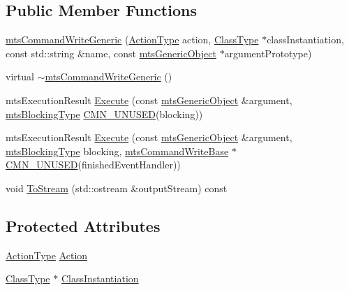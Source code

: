 \subsection*{Public Member Functions}
\begin{DoxyCompactItemize}
\item 
\hyperlink{classmts_command_write_generic_a756523d52f33b00d0591f4dc88869059}{mts\+Command\+Write\+Generic} (\hyperlink{classmts_command_write_generic_aa941087c4b92213fe1b6b670f4ce5a36}{Action\+Type} action, \hyperlink{classmts_command_write_generic_ab4ffe009b7558cff08d309ba7dfb1235}{Class\+Type} $\ast$class\+Instantiation, const std\+::string \&name, const \hyperlink{classmts_generic_object}{mts\+Generic\+Object} $\ast$argument\+Prototype)
\item 
virtual \hyperlink{classmts_command_write_generic_a83dcabde23ba9c1f67af37643ebb4638}{$\sim$mts\+Command\+Write\+Generic} ()
\item 
mts\+Execution\+Result \hyperlink{classmts_command_write_generic_a00ebcfefb63ba9751f70bacb93d77cd6}{Execute} (const \hyperlink{classmts_generic_object}{mts\+Generic\+Object} \&argument, \hyperlink{mts_forward_declarations_8h_ad7426ccb6c883bc780d0ee197dddcbe7}{mts\+Blocking\+Type} \hyperlink{cmn_portability_8h_a021894e2626935fa2305434b1e893ff6}{C\+M\+N\+\_\+\+U\+N\+U\+S\+E\+D}(blocking))
\item 
mts\+Execution\+Result \hyperlink{classmts_command_write_generic_a7cfd8681dcf0ee2effc60c5c1f61c5c3}{Execute} (const \hyperlink{classmts_generic_object}{mts\+Generic\+Object} \&argument, \hyperlink{mts_forward_declarations_8h_ad7426ccb6c883bc780d0ee197dddcbe7}{mts\+Blocking\+Type} blocking, \hyperlink{classmts_command_write_base}{mts\+Command\+Write\+Base} $\ast$\hyperlink{cmn_portability_8h_a021894e2626935fa2305434b1e893ff6}{C\+M\+N\+\_\+\+U\+N\+U\+S\+E\+D}(finished\+Event\+Handler))
\item 
void \hyperlink{classmts_command_write_generic_aac58e354ab9ce4e1e088bb3089093521}{To\+Stream} (std\+::ostream \&output\+Stream) const 
\end{DoxyCompactItemize}
\subsection*{Protected Attributes}
\begin{DoxyCompactItemize}
\item 
\hyperlink{classmts_command_write_generic_aa941087c4b92213fe1b6b670f4ce5a36}{Action\+Type} \hyperlink{classmts_command_write_generic_ac0a7ab9bf5bf14479f46d2f32a259de6}{Action}
\item 
\hyperlink{classmts_command_write_generic_ab4ffe009b7558cff08d309ba7dfb1235}{Class\+Type} $\ast$ \hyperlink{classmts_command_write_generic_a9417d03cc4cc313622021ba6a94f1994}{Class\+Instantiation}
\end{DoxyCompactItemize}
